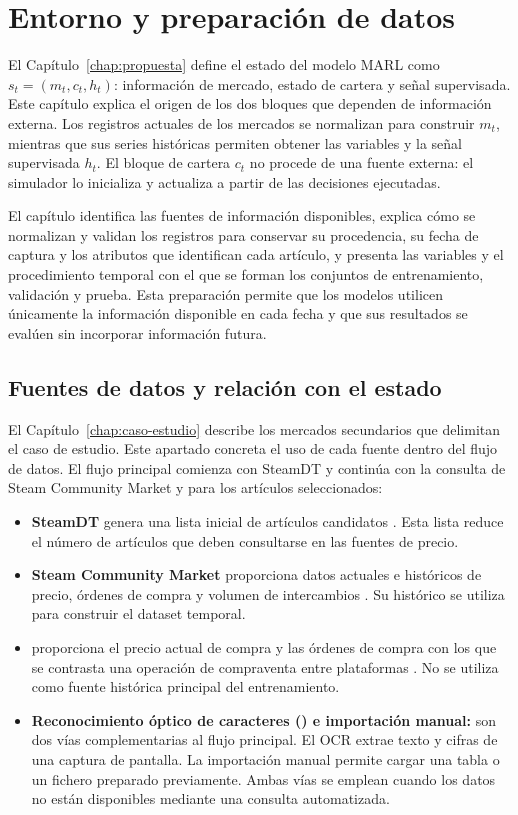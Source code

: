 \chapter{Entorno y preparación de datos}

\noindent El Capítulo~\ref{chap:propuesta} define el estado del modelo MARL como $s_t=(m_t,c_t,h_t)$: información de mercado, estado de cartera y señal supervisada. Este capítulo explica el origen de los dos bloques que dependen de información externa. Los registros actuales de los mercados se normalizan para construir $m_t$, mientras que sus series históricas permiten obtener las variables y la señal supervisada $h_t$. El bloque de cartera $c_t$ no procede de una fuente externa: el simulador lo inicializa y actualiza a partir de las decisiones ejecutadas.

El capítulo identifica las fuentes de información disponibles, explica cómo se normalizan y validan los registros para conservar su procedencia, su fecha de captura y los atributos que identifican cada artículo, y presenta las variables y el procedimiento temporal con el que se forman los conjuntos de entrenamiento, validación y prueba. Esta preparación permite que los modelos utilicen únicamente la información disponible en cada fecha y que sus resultados se evalúen sin incorporar información futura.

\section{Fuentes de datos y relación con el estado}

El Capítulo~\ref{chap:caso-estudio} describe los mercados secundarios que delimitan el caso de estudio. Este apartado concreta el uso de cada fuente dentro del flujo de datos. El flujo principal comienza con SteamDT y continúa con la consulta de Steam Community Market y  para los artículos seleccionados:

\begin{itemize}
  \item \textbf{SteamDT} genera una lista inicial de artículos candidatos \cite{steamDT}. Esta lista reduce el número de artículos que deben consultarse en las fuentes de precio.
  \item \textbf{Steam Community Market} proporciona datos actuales e históricos de precio, órdenes de compra y volumen de intercambios \cite{steamMarketFAQ}. Su histórico se utiliza para construir el dataset temporal.
  \item \textbf{} proporciona el precio actual de compra y las órdenes de compra con los que se contrasta una operación de compraventa entre plataformas \cite{buffMarketplace}. No se utiliza como fuente histórica principal del entrenamiento.
  \item \textbf{Reconocimiento óptico de caracteres () e importación manual:} son dos vías complementarias al flujo principal. El OCR extrae texto y cifras de una captura de pantalla. La importación manual permite cargar una tabla o un fichero preparado previamente. Ambas vías se emplean cuando los datos no están disponibles mediante una consulta automatizada.
\end{itemize}

